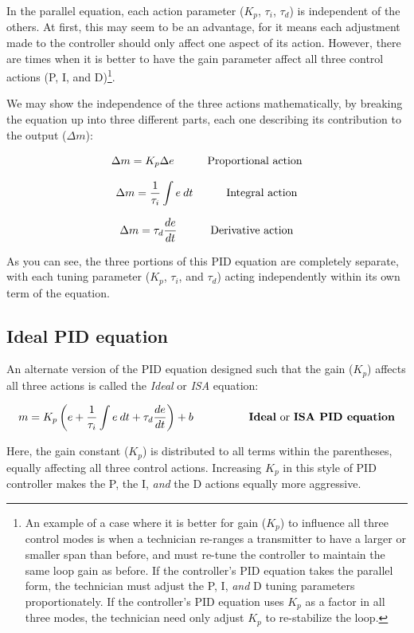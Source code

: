 In the parallel equation, each action parameter ($K_p$, $\tau_i$, $\tau_d$) is independent of the others.  At first, this may seem to be an advantage, for it means each adjustment made to the controller should only affect one aspect of its action.  However, there are times when it is better to have the gain parameter affect all three control actions (P, I, and D)\footnote{An example of a case where it is better for gain ($K_p$) to influence all three control modes is when a technician re-ranges a transmitter to have a larger or smaller span than before, and must re-tune the controller to maintain the same loop gain as before.  If the controller's PID equation takes the parallel form, the technician must adjust the P, I, \textit{and} D tuning parameters proportionately.  If the controller's PID equation uses $K_p$ as a factor in all three modes, the technician need only adjust $K_p$ to re-stabilize the loop.}.

We may show the independence of the three actions mathematically, by breaking the equation up into three different parts, each one describing its contribution to the output ($\Delta m$):

$$\Delta m = K_p \Delta e \hskip 30pt \hbox{Proportional action}$$

$$\Delta m = {1 \over \tau_i} \int e \> dt \hskip 30pt \hbox{Integral action}$$

$$\Delta m = \tau_d {de \over dt} \hskip 30pt \hbox{Derivative action}$$

As you can see, the three portions of this PID equation are completely separate, with each tuning parameter ($K_p$, $\tau_i$, and $\tau_d$) acting independently within its own term of the equation.



\filbreak
\subsection{Ideal PID equation}

An alternate version of the PID equation designed such that the gain ($K_p$) affects all three actions is called the \textit{Ideal} or \textit{ISA} equation:    

$$m = K_p \left( e + {1 \over \tau_i} \int e \> dt + \tau_d {de \over dt} \right) + b \hbox{\hskip 50pt \textbf{Ideal} or \textbf{ISA PID equation}}$$

Here, the gain constant ($K_p$) is distributed to all terms within the parentheses, equally affecting all three control actions.  Increasing $K_p$ in this style of PID controller makes the P, the I, \textit{and} the D actions equally more aggressive.

